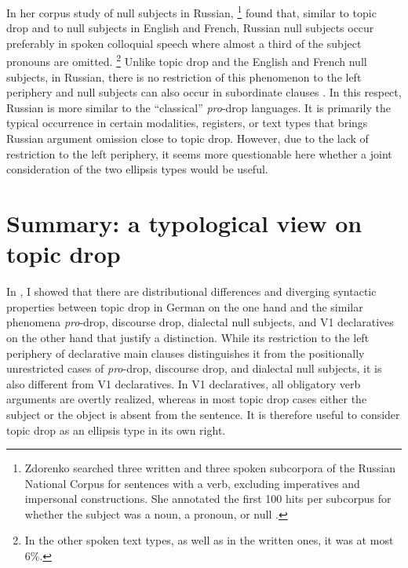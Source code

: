 In her corpus  study of null subjects in Russian,%
\footnote{Zdorenko searched three written and three spoken subcorpora  of the Russian  National Corpus for sentences with a verb, excluding imperatives and impersonal constructions.
She annotated the first 100 hits per subcorpus for whether the subject was a noun, a pronoun, or null \citep[124--125]{zdorenko2010}.}
%
 \citet[126]{zdorenko2010} found that, similar to topic drop and to null subjects in English and French, Russian  null subjects occur preferably in spoken colloquial speech where almost a third of the subject pronouns are omitted.%
\footnote{In the other spoken text types, as well as in the written ones, it was at most 6\%.}
%
Unlike topic drop and the English and French null subjects, in Russian,  there is no restriction of this phenomenon to the left periphery and null subjects can also occur in subordinate clauses \citep[e.g.,][302, his example 30]{franks1995}.
In this respect, Russian  is more similar to the ``classical'' \textit{pro}-drop languages. 
It is primarily the typical occurrence in certain modalities, registers, or text types  that brings Russian  argument omission close to topic drop.
However, due to the lack of restriction to the left periphery, it seems more questionable here whether a joint consideration of the two ellipsis types would be useful.  

\section{Summary: a typological view on topic drop}\label{sec:typological.summary}
In , I showed that there are distributional differences and diverging syntactic properties between topic drop in German on the one hand and the similar phenomena \textit{pro}-drop, discourse drop, dialectal null subjects, and V1 declaratives on the other hand that justify a distinction.
While its restriction to the left periphery of declarative main clauses distinguishes it from the positionally unrestricted cases of \textit{pro}-drop, discourse drop, and dialectal null subjects,  it is also different from V1 declaratives.   
In V1 declaratives, all obligatory verb arguments  are overtly realized, whereas in most topic drop cases either the subject or the object is absent from the sentence. 
It is therefore useful to consider topic drop as an ellipsis type in its own right.


